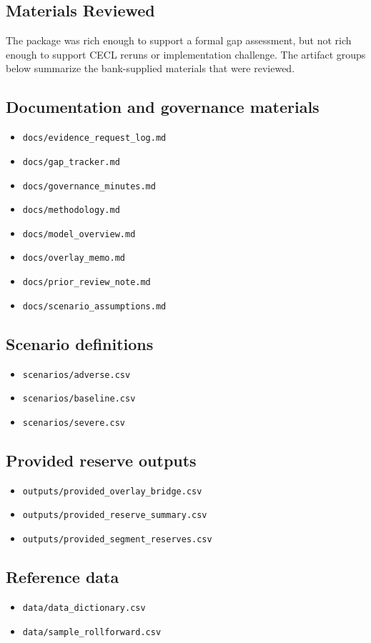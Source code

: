\documentclass[11pt]{article}
\begin{document}
\subsection*{Materials Reviewed}
The package was rich enough to support a formal gap assessment, but not rich enough to support CECL reruns or implementation challenge. The artifact groups below summarize the bank-supplied materials that were reviewed.
\subsection*{Documentation and governance materials}
\begin{itemize}
\item \texttt{docs/evidence\_request\_log.md}
\item \texttt{docs/gap\_tracker.md}
\item \texttt{docs/governance\_minutes.md}
\item \texttt{docs/methodology.md}
\item \texttt{docs/model\_overview.md}
\item \texttt{docs/overlay\_memo.md}
\item \texttt{docs/prior\_review\_note.md}
\item \texttt{docs/scenario\_assumptions.md}
\end{itemize}
\subsection*{Scenario definitions}
\begin{itemize}
\item \texttt{scenarios/adverse.csv}
\item \texttt{scenarios/baseline.csv}
\item \texttt{scenarios/severe.csv}
\end{itemize}
\subsection*{Provided reserve outputs}
\begin{itemize}
\item \texttt{outputs/provided\_overlay\_bridge.csv}
\item \texttt{outputs/provided\_reserve\_summary.csv}
\item \texttt{outputs/provided\_segment\_reserves.csv}
\end{itemize}
\subsection*{Reference data}
\begin{itemize}
\item \texttt{data/data\_dictionary.csv}
\item \texttt{data/sample\_rollforward.csv}
\end{itemize}
\end{document}
